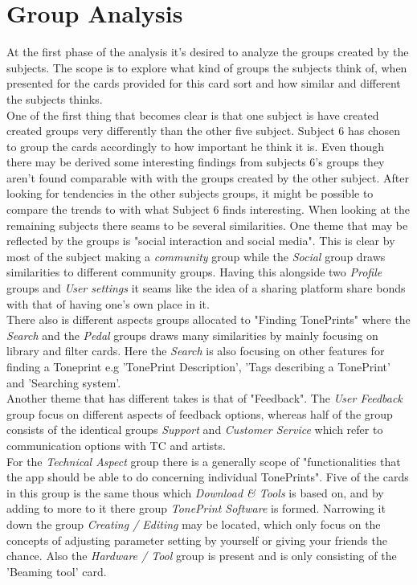 \section{Group Analysis}
\label{GroupAnalysis}
%
At the first phase of the analysis it's desired to analyze the groups created by the subjects. The scope is to explore what kind of groups the subjects think of, when presented for the cards provided for this card sort and how similar and different the subjects thinks.\\  
One of the first thing that becomes clear is that one subject is have created created groups very differently than the other five subject. Subject 6 has chosen to group the cards accordingly to how important he think it is. Even though there may be derived some interesting findings from subjects 6's groups they aren't found comparable with with the groups created by the other subject. After looking for tendencies in the other subjects groups, it might be possible to compare the trends to with what Subject 6 finds interesting. When looking at the remaining subjects there seams to be several similarities. One theme that may be reflected by the groups is "social interaction and social media". This is clear by most of the subject making a \textit{community} group while the \textit{Social} group draws similarities to different community groups. Having this alongside two \textit{Profile} groups and \textit{User settings} it seams like the idea of a sharing platform share bonds with that of having one's own place in it.  \\
There also is different aspects groups allocated to "Finding TonePrints" where the \textit{Search} and the \textit{Pedal} groups draws many similarities by mainly focusing on library and filter cards. Here the \textit{Search} is also focusing on other features for finding a Toneprint e.g 'TonePrint Description', 'Tags describing a TonePrint' and 'Searching system'.  \\
Another theme that has different takes is that of "Feedback". The \textit{User Feedback} group focus on different aspects of feedback options, whereas half of the group consists of the identical groups \textit{Support} and \textit{Customer Service} which refer to communication options with TC and artists. \\
For the \textit{Technical Aspect} group there is a generally scope of "functionalities that the app should be able to do concerning individual TonePrints". Five of the cards in this group is the same thous which \textit{Download \& Tools} is based on, and by adding to more to it there group \textit{TonePrint Software} is formed. Narrowing it down the group \textit{Creating / Editing} may be located, which only focus on the concepts of adjusting parameter setting by yourself or giving your friends the chance. Also the \textit{Hardware / Tool} group is present and is only consisting of the 'Beaming tool' card.\\
